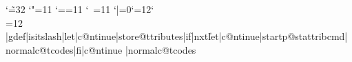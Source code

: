 \def\setdefaultattrib#1#2{\trace{A}{Default attrib for #1 is #2}\x@\xdef\csname defaultattrkey-#1\endcsname{#2}}

\x@{}
\x@{}
\def\extend@ttriblist#1#2{%
  \edef\tmpa{#2}%
  \edef\@ttrlistname{@ttriblist-#1}%
  \x@\let\x@\tmp\csname\@ttrlistname\endcsname
  \ifx\tmp\relax
    \x@\let\x@\tmp\csname defaultattrkey-#1\endcsname
  \fi
  \x@\xdef\csname \@ttrlistname\endcsname{\tmp,#2}%
}

\edef\p@stattribcmd{}%


\def\oddc@tcodes{\xdef\sl@shcode{\the\catcode`\/}\catcode`"=11 \catcode`==11
\catcode`\ =11 \catcode`|=0\catcode`\/=12\catcode`\\=12}
\def\normalc@tcodes{\catcode`"=12 \catcode`==12
\catcode`\ =10\catcode`\\=0\catcode`\/=\sl@shcode\catcode`\|=12}
%


\xdef\attribsus@d{}%

%
%
\def\start@ttributegrab{\let\c@ntinue\isitslash\oddc@tcodes\futurelet\nxt\c@ntinue}
\def\end@ttributegrab{%
  \xdef\@ttributes{\x@\noexpand\x@{\@ttributes}}%
  \trace{A}{Now executing \p@stattribcmd}%
  \csname\p@stattribcmd\endcsname}%

\def\store@ttributes#1{\def\newbit{#1}\edef\@ttributes{\@ttributes\newbit}\futurelet\nxt\isitslash}
\def\startp@stattribcmd#1{\futurelet\nxt\isitcmd}
\def\storep@stattribcmd#1{\def\newbit{#1}\edef\p@stattribcmd{\p@stattribcmd\newbit}\futurelet\nxt\isitcmd}
\lccode`\~=32
\lowercase{
 \gdef\isitcmd{%
        \let\c@ntinue\storep@stattribcmd
        \ifcat a\nxt\else%
	\let\c@ntinue\end@ttributegrab\fi%
	\c@ntinue}%
}
\oddc@tcodes%
|gdef|isitslash{|let|c@ntinue|store@ttributes|if|nxt\|let|c@ntinue|startp@stattribcmd|normalc@tcodes|fi|c@ntinue}%
|normalc@tcodes%
%
%
%

